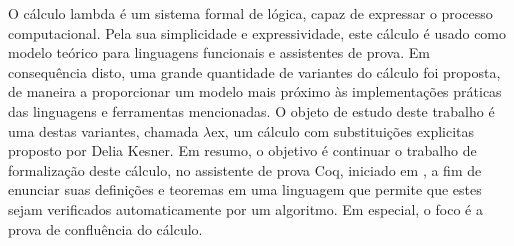 O cálculo lambda é um sistema formal de lógica, capaz de expressar o processo computacional.
Pela sua simplicidade e expressividade, este cálculo é usado como modelo teórico
para linguagens funcionais e assistentes de prova. Em consequência disto, 
uma grande quantidade de variantes do cálculo foi proposta, de maneira a proporcionar
um modelo mais próximo às implementações práticas das linguagens e ferramentas mencionadas.
O objeto de estudo deste trabalho é uma destas variantes, chamada $\lambda$ex,
um cálculo com substituições explicitas proposto por Delia Kesner.
Em resumo, o objetivo é continuar o trabalho de formalização
deste cálculo, no assistente de prova Coq, iniciado em \cite{initial}, a fim de enunciar suas definições e teoremas 
em uma linguagem que permite que estes sejam verificados automaticamente por um algoritmo.
Em especial, o foco é a prova de confluência do cálculo.

